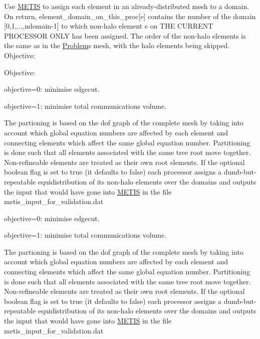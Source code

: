 Use \hyperlink{namespaceoomph_1_1METIS}{M\+E\+T\+IS} to assign each element in an already-\/distributed mesh to a domain. On return, element\+\_\+domain\+\_\+on\+\_\+this\+\_\+proc\mbox{[}e\mbox{]} contains the number of the domain \mbox{[}0,1,...,ndomain-\/1\mbox{]} to which non-\/halo element e on T\+HE C\+U\+R\+R\+E\+NT P\+R\+O\+C\+E\+S\+S\+OR O\+N\+LY has been assigned. The order of the non-\/halo elements is the same as in the \hyperlink{classoomph_1_1Problem}{Problem}\textquotesingle{}s mesh, with the halo elements being skipped. Objective\+:

Objective\+:
\begin{DoxyItemize}
\item objective=0\+: minimise edgecut.
\item objective=1\+: minimise total communications volume.
\end{DoxyItemize}The partioning is based on the dof graph of the complete mesh by taking into account which global equation numbers are affected by each element and connecting elements which affect the same global equation number. Partitioning is done such that all elements associated with the same tree root move together. Non-\/refineable elements are treated as their own root elements. If the optional boolean flag is set to true (it defaults to false) each processor assigns a dumb-\/but-\/repeatable equidistribution of its non-\/halo elements over the domains and outputs the input that would have gone into \hyperlink{namespaceoomph_1_1METIS}{M\+E\+T\+IS} in the file metis\+\_\+input\+\_\+for\+\_\+validation.\+dat


\begin{DoxyItemize}
\item objective=0\+: minimise edgecut.
\item objective=1\+: minimise total communications volume.
\end{DoxyItemize}The partioning is based on the dof graph of the complete mesh by taking into account which global equation numbers are affected by each element and connecting elements which affect the same global equation number. Partitioning is done such that all elements associated with the same tree root move together. Non-\/refineable elements are treated as their own root elements. If the optional boolean flag is set to true (it defaults to false) each processor assigns a dumb-\/but-\/repeatable equidistribution of its non-\/halo elements over the domains and outputs the input that would have gone into \hyperlink{namespaceoomph_1_1METIS}{M\+E\+T\+IS} in the file metis\+\_\+input\+\_\+for\+\_\+validation.\+dat 

